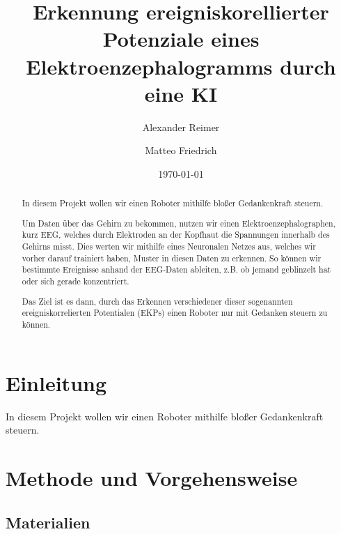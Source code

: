 \documentclass{scrartcl}
\title{Erkennung ereigniskorellierter Potenziale eines Elektroenzephalogramms durch eine KI }
\date{\today}
\author{Alexander Reimer \and Matteo Friedrich}
\begin{document}
	\maketitle
    \begin{abstract}
		In diesem Projekt wollen wir einen Roboter mithilfe bloßer Gedankenkraft steuern.
		
		Um Daten über das Gehirn zu bekommen, nutzen wir einen Elektroenzephalographen, kurz EEG, welches durch Elektroden an der Kopfhaut die Spannungen innerhalb des Gehirns misst. Dies werten wir mithilfe eines Neuronalen Netzes aus, welches wir vorher darauf trainiert haben, Muster in diesen Daten zu erkennen. So können wir bestimmte Ereignisse anhand der EEG-Daten ableiten, z.B. ob jemand geblinzelt hat oder sich gerade konzentriert.
		
		Das Ziel ist es dann, durch das Erkennen verschiedener dieser sogenannten ereigniskorrelierten Potentialen (EKPs) einen Roboter nur mit Gedanken steuern zu können. 
	\end{abstract}
	\newpage
	\tableofcontents
	\newpage
	\section{Einleitung}
	In diesem Projekt wollen wir einen Roboter mithilfe bloßer Gedankenkraft steuern.
	\section{Methode und Vorgehensweise}

	\subsection{Materialien} \label{Materialien}
\end{document}
